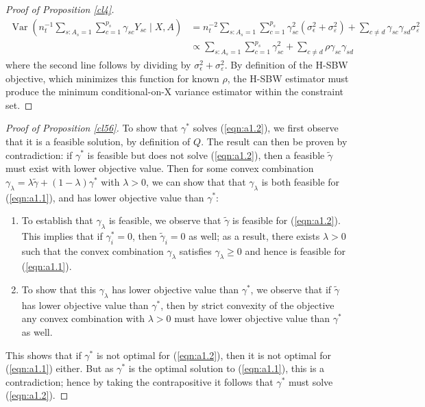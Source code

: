 \documentclass[aoas]{imsart}
\theoremstyle{plain}
\theoremstyle{remark}
\begin{document}
\begin{appendix}
\begin{proof}[Proof of Proposition \ref{cl4}]
\begin{align*}
    \operatorname{Var}\left( n_t^{-1}\sum_{s: A_s = 1}\sum_{c = 1}^{p_s}\gamma_{sc}Y_{sc} \mid X, A\right) &= n_t^{-2}\sum_{s: A_s = 1}\sum_{c = 1}^{p_s}\gamma_{sc}^2(\sigma^2_{\epsilon} + \sigma^2_{\varepsilon}) + \sum_{c \ne d}\gamma_{sc}\gamma_{sd}\sigma^2_{\varepsilon} \\
    &\propto \sum_{s: A_s = 1}\sum_{c = 1}^{p_s}\gamma_{sc}^2 + \sum_{c \ne d}\rho \gamma_{sc}\gamma_{sd}
\end{align*}
%
where the second line follows by dividing by $\sigma^2_{\epsilon} + \sigma^2_{\varepsilon}$. By definition of the H-SBW objective, which minimizes this function for known $\rho$, the H-SBW estimator must produce the minimum conditional-on-X variance estimator within the constraint set.
\end{proof}


\begin{proof}[Proof of Proposition \ref{cl56}]

    To show that $\gamma^*$ solves (\ref{eqn:a1.2}), we first observe that it is a feasible solution, by definition of $Q$. The result can then be proven by contradiction: if $\gamma^*$ is feasible but does not solve (\ref{eqn:a1.2}), then a feasible $\tilde{\gamma}$ must exist with lower objective value. Then for some convex combination $\gamma_\lambda = \lambda \tilde{\gamma} + (1-\lambda)\gamma^*$ with $\lambda > 0$, we can show that that $\gamma_\lambda$ is both feasible for (\ref{eqn:a1.1}), and has lower objective value than $\gamma^*$:
    \begin{enumerate}
        \item     To establish that $\gamma_\lambda$ is feasible, we observe that $\tilde{\gamma}$ is feasible for (\ref{eqn:a1.2}). This implies that if $\gamma^*_i=0$, then $\tilde{\gamma}_i=0$ as well; as a result, there exists $\lambda > 0$ such that the convex combination $\gamma_\lambda$ satisfies $\gamma_\lambda \geq 0$ and hence is feasible for (\ref{eqn:a1.1}).
    \item     To show that this $\gamma_\lambda$ has lower objective value than $\gamma^*$, we observe that if $\tilde{\gamma}$ has lower objective value than $\gamma^*$, then by strict convexity of the objective any convex combination with $\lambda > 0$ must have lower objective value than $\gamma^*$ as well.
    \end{enumerate}
    This shows that if $\gamma^*$ is not optimal for (\ref{eqn:a1.2}), then it is not optimal for (\ref{eqn:a1.1}) either. But as $\gamma^*$ is the optimal solution to (\ref{eqn:a1.1}), this is a contradiction; hence by taking the contrapositive it follows that $\gamma^*$ must solve (\ref{eqn:a1.2}).
    

\end{proof}
\end{appendix}
\end{document}
